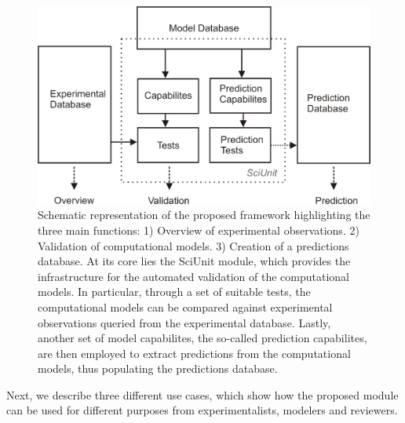 \documentclass[a4paper,10pt]{article}
\begin{document}
\begin{figure}
\includegraphics[width=\textwidth]{Figures/SciUnit-Paper-Schematic}
\caption{Schematic representation of the proposed framework highlighting the three main functions: 1) Overview of experimental observations. 2) Validation of computational models. 3) Creation of a predictions database. At its core
lies the SciUnit module, which provides the infrastructure for the automated validation of the computational models. In particular, through a set of suitable tests, the computational models can be compared against experimental observations
queried from the experimental database. Lastly, another set of model capabilites, the so-called prediction capabilites, are then employed to extract predictions from the computational models, thus populating the predictions database. }
\label{Fig:Scheme}
\end{figure}

Next, we describe three different use cases, which show how the proposed module can be used for different purposes from experimentalists, modelers and reviewers. 
\end{document}
